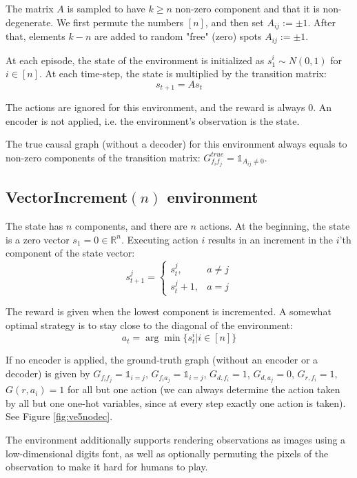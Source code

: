 \documentclass[a4paper,11pt,oneside]{report}
\begin{document}
The matrix $A$ is sampled to have $k\geq n$ non-zero component and that it is non-degenerate. We first permute the numbers $[n]$, and then set $A_{ij}:=\pm 1$.
After that, elements $k-n$ are added to random "free" (zero) spots $A_{ij}:=\pm 1$.

At each episode, the state of the environment is initialized as $s_1^i\sim N(0,1)$ for $i\in[n]$. At each time-step, the state is multiplied by the transition matrix:
$$
s_{t+1}=As_t
$$

The actions are ignored for this environment, and the reward is always $0$. An encoder is not applied, i.e. the environment's observation is the state.

The true causal graph (without a decoder) for this environment always equals to non-zero components of the transition matrix: $G^{true}_{f_if_j}=\mathds 1_{A_{ij}\neq 0}$.

\subsection{VectorIncrement$(n)$ environment}
The state has $n$ components, and there are $n$ actions. At the beginning, the state is a zero vector $s_1=0\in\mathbb R^n$. Executing action $i$ results in an increment in the $i$'th component of the state vector:
$$
s^j_{t+1}=\begin{cases}
s^j_t,&a\neq j\\
s^j_t+1,&a=j
\end{cases}
$$

The reward is given when the lowest component is incremented. A somewhat optimal strategy is to stay close to the diagonal of the environment:
$$
a_t=\arg\min \{s_t^i\big| i\in[n]\}
$$

If no encoder is applied, the ground-truth graph (without an encoder or a decoder) is given by $G_{f_if_j}=\mathds 1_{i=j}$, $G_{f_ia_j}=\mathds 1_{i=j}$, $G_{d,f_i}=1$, $G_{d,a_j}=0$, $G_{r,f_i}=1$, $G(r,a_i)=1$ for all but one action (we can always determine the action taken by all but one one-hot variables, since at every step exactly one action is taken). See Figure \ref{fig:ve5nodec}.

The environment additionally supports rendering observations as images using a low-dimensional digits font, as well as optionally permuting the pixels of the observation to make it hard for humans to play.
\end{document}
